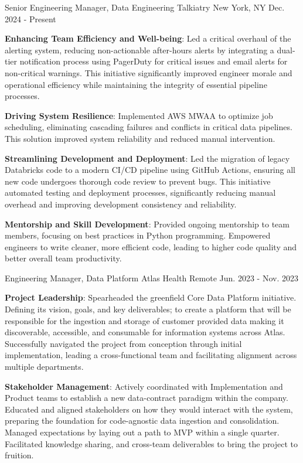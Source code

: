 \begin{cventries}
  \cventry
    {Senior Engineering Manager, Data Engineering}
    {Talkiatry}
    {New York, NY}
    {Dec. 2024 - Present}
    {
      \begin{cvitems}
          \item {\textbf{Enhancing Team Efficiency and Well-being}: Led a critical overhaul of the alerting system, reducing non-actionable after-hours alerts by integrating a dual-tier notification process using PagerDuty for critical issues and email alerts for non-critical warnings. This initiative significantly improved engineer morale and operational efficiency while maintaining the integrity of essential pipeline processes.}
          \item {\textbf{Driving System Resilience}: Implemented AWS MWAA to optimize job scheduling, eliminating cascading failures and conflicts in critical data pipelines. This solution improved system reliability and reduced manual intervention.}
          \item {\textbf{Streamlining Development and Deployment}: Led the migration of legacy Databricks code to a modern CI/CD pipeline using GitHub Actions, ensuring all new code undergoes thorough code review to prevent bugs. This initiative automated testing and deployment processes, significantly reducing manual overhead and improving development consistency and reliability.}
          \item {\textbf{Mentorship and Skill Development}: Provided ongoing mentorship to team members, focusing on best practices in Python programming. Empowered engineers to write cleaner, more efficient code, leading to higher code quality and better overall team productivity.}
      \end{cvitems}
    }
  \cventry
    {Engineering Manager, Data Platform}
    {Atlas Health}
    {Remote}
    {Jun. 2023 - Nov. 2023}
    {
      \begin{cvitems}
          \item {\textbf{Project Leadership}: Spearheaded the greenfield Core Data Platform initiative. Defining its vision, goals, and key deliverables; to create a platform that will be responsible for the ingestion and storage of customer provided data making it discoverable, accessible, and consumable for information systems across Atlas. Successfully navigated the project from conception through initial implementation, leading a cross-functional team and facilitating alignment across multiple departments.}
          \item {\textbf{Stakeholder Management}: Actively coordinated with Implementation and Product teams to establish a new data-contract paradigm within the company. Educated and aligned stakeholders on how they would interact with the system, preparing the foundation for code-agnostic data ingestion and consolidation. Managed expectations by laying out a path to MVP within a single quarter. Facilitated knowledge sharing, and cross-team deliverables to bring the project to fruition.}

\end{cvitems}}
\end{cventries}
